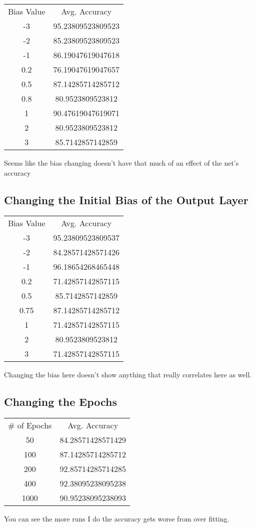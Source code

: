 \documentclass[letterpaper]{article}
\begin{document}
\begin{center}
\begin{tabular}{ |c| |c|  }
Bias Value & Avg. Accuracy\\
-3 & 95.23809523809523\\
-2 & 85.23809523809523\\
-1 & 86.19047619047618\\
0.2 & 76.19047619047657\\
0.5 & 87.14285714285712\\
0.8 & 80.9523809523812\\
1 & 90.47619047619071\\
2  & 80.9523809523812\\
3 & 85.7142857142859\\
\end{tabular}
\end{center}


Seems like the bias changing doesn't have that much of an effect of the net's accuracy  

\subsection{Changing the Initial Bias of the Output Layer}
\begin{center}
\begin{tabular}{ |c| |c|  }
Bias Value & Avg. Accuracy\\
-3 & 95.23809523809537\\
-2 & 84.28571428571426\\
-1 & 96.18654268465448\\
0.2 & 71.42857142857115\\
0.5 & 85.7142857142859\\
0.75 & 87.14285714285712\\
1 & 71.42857142857115\\
2 & 80.9523809523812\\
3 & 71.42857142857115\\
\end{tabular}
\end{center}
Changing the bias here doesn't show anything that really correlates here as well. 

\subsection{Changing the Epochs}

\begin{center}
\begin{tabular}{ |c| |c| }
\# of Epochs & Avg. Accuracy\\ 
50 & 84.28571428571429\\
100 & 87.14285714285712\\
200 & 92.85714285714285\\
400 & 92.38095238095238\\
1000 & 90.95238095238093\\
\end{tabular}
\end{center}
You can see the more runs I do the accuracy gets worse from over fitting.

\begin{lstlisting}
\end{lstlisting}
\end{document}
